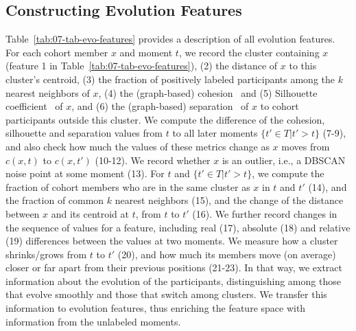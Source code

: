 \documentclass[
  oneside]{book}
\begin{document}
\hypertarget{evo-concept-evo-features}{%
\subsection{Constructing Evolution Features}\label{evo-concept-evo-features}}

Table~\ref{tab:07-tab-evo-features} provides a description of all evolution features.
For each cohort member \(x\) and moment \(t\), we record the cluster containing \(x\) (feature 1 in Table~\ref{tab:07-tab-evo-features}),
(2) the distance of \(x\) to this cluster's centroid,
(3) the fraction of positively labeled participants among the \(k\) nearest neighbors of \(x\),
(4) the (graph-based) cohesion~\autocite{TanDMbook} and (5) Silhouette coefficient~\autocite{TanDMbook} of \(x\), and (6) the (graph-based) separation~\autocite{TanDMbook} of \(x\) to cohort participants outside this cluster.
We compute the difference of the cohesion, silhouette and separation values from \(t\) to all later moments \(\{t' \in T|t'>t\}\) (7-9), and also check how much the values of these metrics change as \(x\) moves from \(c(x,t)\) to \(c(x,t')\) (10-12).
We record whether \(x\) is an outlier, i.e., a DBSCAN noise point at some moment (13).
For \(t\) and \(\{t' \in T|t'>t\}\), we compute the fraction of cohort members who are in the same cluster as \(x\) in \(t\) and \(t'\) (14), and the fraction of common \(k\) nearest neighbors (15), and the change of the distance between \(x\) and its centroid at \(t\), from \(t\) to \(t'\) (16).
We further record changes in the sequence of values for a feature, including real (17), absolute (18) and relative (19) differences between the values at two moments.
We measure how a cluster shrinks/grows from \(t\) to \(t'\) (20), and how much its members move (on average) closer or far apart from their previous positions (21-23).
In that way, we extract information about the evolution of the participants, distinguishing among those that evolve smoothly and those that switch among clusters.
We transfer this information to evolution features, thus enriching the feature space with information from the unlabeled moments.
\end{document}
